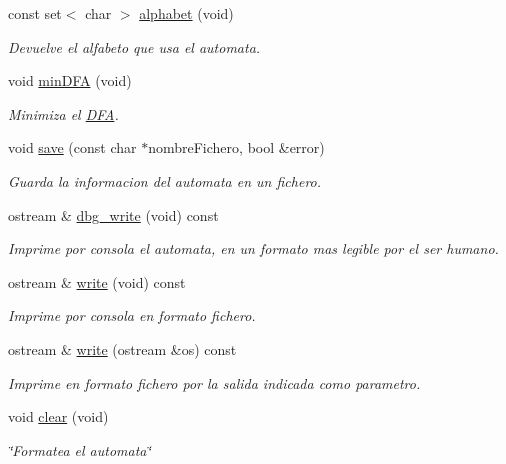 \begin{DoxyCompactItemize}
const set$<$ char $>$ \hyperlink{class_d_f_a_a0884e79fd0a48a42e49fe7854a19628d}{alphabet} (void)
\begin{DoxyCompactList}\small\item\em Devuelve el alfabeto que usa el automata. \end{DoxyCompactList}\item 
void \hyperlink{class_d_f_a_ab17185eaa4d96f9822bab514372abdd9}{min\+D\+FA} (void)
\begin{DoxyCompactList}\small\item\em Minimiza el \hyperlink{class_d_f_a}{D\+FA}. \end{DoxyCompactList}\item 
void \hyperlink{class_d_f_a_ac614efadfde86fde0b0ab45f2c9c2e5e}{save} (const char $\ast$nombre\+Fichero, bool \&error)
\begin{DoxyCompactList}\small\item\em Guarda la informacion del automata en un fichero. \end{DoxyCompactList}\item 
ostream \& \hyperlink{class_d_f_a_ac7f9b36f9c298f1dfd53c4bdf395c1d5}{dbg\+\_\+write} (void) const
\begin{DoxyCompactList}\small\item\em Imprime por consola el automata, en un formato mas legible por el ser humano. \end{DoxyCompactList}\item 
ostream \& \hyperlink{class_d_f_a_a453bbd313adb90e3615694aad833b014}{write} (void) const
\begin{DoxyCompactList}\small\item\em Imprime por consola en formato fichero. \end{DoxyCompactList}\item 
ostream \& \hyperlink{class_d_f_a_aec27d0774ad67c7c29a5679e938fab5d}{write} (ostream \&os) const
\begin{DoxyCompactList}\small\item\em Imprime en formato fichero por la salida indicada como parametro. \end{DoxyCompactList}\item 
void \hyperlink{class_d_f_a_a2abcdde01c9833f97b99c9d1c7e739aa}{clear} (void)
\begin{DoxyCompactList}\small\item\em \char`\"{}\+Formatea el automata\char`\"{} \end{DoxyCompactList}\end{DoxyCompactItemize}



